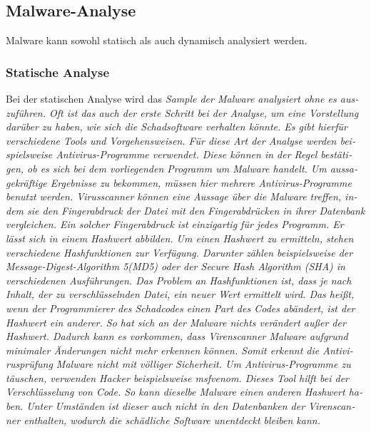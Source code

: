 \begin{otherlanguage}{ngerman}
\subsection{Malware-Analyse}
Malware kann sowohl statisch als auch dynamisch analysiert werden.
\subsubsection{Statische Analyse}
Bei der statischen Analyse wird das \it Sample \rm der Malware analysiert ohne es auszuführen. Oft ist das auch der erste Schritt bei der Analyse, um eine Vorstellung darüber zu haben, wie sich die Schadsoftware verhalten könnte. Es gibt hierfür verschiedene Tools und Vorgehensweisen. 
\newline 
Für diese Art der Analyse werden beispielsweise Antivirus-Programme verwendet. Diese können in der Regel bestätigen, ob es sich bei dem vorliegenden Programm um Malware handelt. Um aussagekräftige Ergebnisse zu bekommen, müssen hier mehrere Antivirus-Programme benutzt werden. Virusscanner können eine Aussage über die Malware treffen, indem sie den \dq Fingerabdruck \dq{} der Datei mit den Fingerabdrücken in ihrer Datenbank vergleichen. Ein solcher \dq Fingerabdruck\dq{} ist einzigartig für jedes Programm. Er lässt sich in einem Hashwert abbilden. Um einen Hashwert zu ermitteln, stehen verschiedene Hashfunktionen zur Verfügung. Darunter zählen beispielsweise der \dq Message-Digest-Algorithm 5\dq (MD5) oder der \dq Secure Hash Algorithm\dq{} (SHA) in verschiedenen Ausführungen. Das Problem an Hashfunktionen ist, dass je nach Inhalt, der zu verschlüsselnden Datei, ein neuer Wert ermittelt wird. Das heißt, wenn der Programmierer des Schadcodes einen Part des Codes abändert, ist der Hashwert ein anderer. So hat sich an der Malware nichts verändert außer der Hashwert. Dadurch kann es vorkommen, dass Virenscanner Malware aufgrund minimaler Änderungen nicht mehr erkennen können. Somit erkennt die Antivirusprüfung Malware nicht mit völliger Sicherheit. Um Antivirus-Programme zu täuschen, verwenden Hacker beispielsweise \it msfvenom\rm. Dieses Tool hilft bei der Verschlüsselung von Code. So kann dieselbe Malware einen anderen Hashwert haben. Unter Umständen ist dieser auch nicht in den Datenbanken der Virenscanner enthalten, wodurch die schädliche Software unentdeckt bleiben kann.
\newline

\end{otherlanguage}

